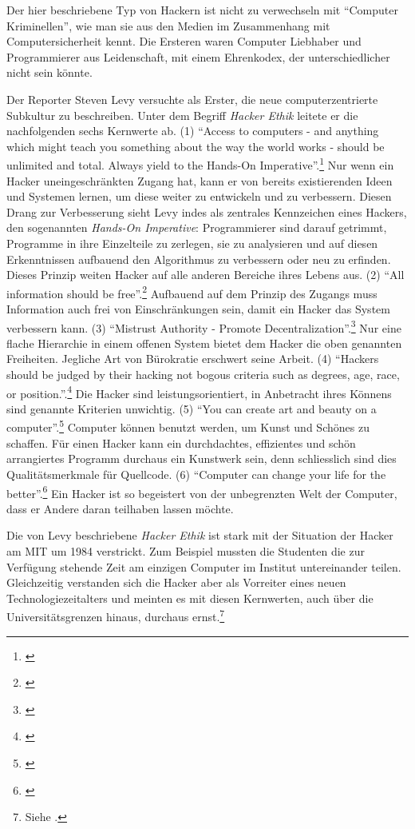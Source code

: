 \documentclass[
paper=164mm:234mm, %
pagesize, %
DIV=calc, %
10pt, %
parskip=half- %
]{scrbook}
\begin{document}
Der hier beschriebene Typ von Hackern ist nicht zu verwechseln mit \enquote{Computer Kriminellen}, wie man sie aus den Medien im Zusammenhang mit Computersicherheit kennt. Die Ersteren waren Computer Liebhaber und Programmierer aus Leidenschaft, mit einem Ehrenkodex, der unterschiedlicher nicht sein könnte.

Der Reporter Steven Levy versuchte als Erster, die neue computerzentrierte Subkultur zu beschreiben. Unter dem Begriff \emph{Hacker Ethik} leitete er die nachfolgenden sechs Kernwerte ab.
(1) \enquote{Access to computers - and anything which might teach you something about the way the world works - should be unlimited and total. Always yield to the Hands-On Imperative}.\footnote{\cite[27]{Levy:1984}} Nur wenn ein Hacker uneingeschränkten Zugang hat, kann er von bereits existierenden Ideen und Systemen lernen, um diese weiter zu entwickeln und zu verbessern. Diesen Drang zur Verbesserung sieht Levy indes als zentrales Kennzeichen eines Hackers, den sogenannten \emph{Hands-On Imperative}: Programmierer sind darauf getrimmt, Programme in ihre Einzelteile zu zerlegen, sie zu analysieren und auf diesen Erkenntnissen aufbauend den Algorithmus zu verbessern oder neu zu erfinden. Dieses Prinzip weiten Hacker auf alle anderen Bereiche ihres Lebens aus.
(2) \enquote{All information should be free}.\footnote{\cite[27]{Levy:1984}} Aufbauend auf dem Prinzip des Zugangs muss Information auch frei von Einschränkungen sein, damit ein Hacker das System verbessern kann.
(3) \enquote{Mistrust Authority - Promote Decentralization}.\footnote{\cite[28]{Levy:1984}} Nur eine flache Hierarchie in einem offenen System bietet dem Hacker die oben genannten Freiheiten. Jegliche Art von Bürokratie erschwert seine Arbeit.
(4) \enquote{Hackers should be judged by their hacking not bogous criteria such as degrees, age, race, or position.}.\footnote{\cite[30]{Levy:1984}} Die Hacker sind leistungsorientiert, in Anbetracht ihres Könnens sind genannte Kriterien unwichtig.
(5) \enquote{You can create art and beauty on a computer}.\footnote{\cite[30]{Levy:1984}} Computer können benutzt werden, um Kunst und Schönes zu schaffen. Für einen Hacker kann ein durchdachtes, effizientes und schön arrangiertes Programm durchaus ein Kunstwerk sein, denn schliesslich sind dies Qualitätsmerkmale für Quellcode.
(6) \enquote{Computer can change your life for the better}.\footnote{\cite[33]{Levy:1984}} Ein Hacker ist so begeistert von der unbegrenzten Welt der Computer, dass er Andere daran teilhaben lassen möchte.

Die von Levy beschriebene \emph{Hacker Ethik} ist stark mit der Situation der Hacker am MIT um 1984 verstrickt. Zum Beispiel mussten die Studenten die zur Verfügung stehende Zeit am einzigen Computer im Institut untereinander teilen. Gleichzeitig verstanden sich die Hacker aber als Vorreiter eines neuen Technologiezeitalters und meinten es mit diesen Kernwerten, auch über die Universitätsgrenzen hinaus, durchaus ernst.\footnote{Siehe \cite[26-37]{Levy:1984}.}
\end{document}
